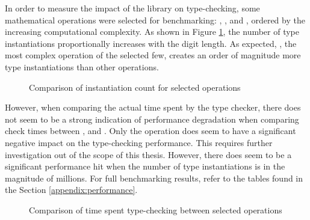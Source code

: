 In order to measure the impact of the library on type-checking, some mathematical operations were selected for benchmarking: , ,  and , ordered by the increasing computational complexity. As shown in Figure \ref{fig:instantiation-count}, the number of type instantiations proportionally increases with the digit length. As expected, , the most complex operation of the selected few, creates an order of magnitude more type instantiations than other operations.

\begin{figure}[ht]
  \centering
  \resizebox{\textwidth}{!}{}
  \caption{Comparison of instantiation count for selected operations}
  \label{fig:instantiation-count}
\end{figure}

However, when comparing the actual time spent by the type checker, there does not seem to be a strong indication of performance degradation when comparing check times between ,  and . Only the  operation does seem to have a significant negative impact on the type-checking performance. This requires further investigation out of the scope of this thesis. However, there does seem to be a significant performance hit when the number of type instantiations is in the magnitude of millions. For full benchmarking results, refer to the tables found in the Section \ref{appendix:performance}.

\begin{figure}[ht]
  \centering
  \resizebox{\textwidth}{!}{}
  \caption{Comparison of time spent type-checking between selected operations}
  \label{fig:check-time}
\end{figure}


